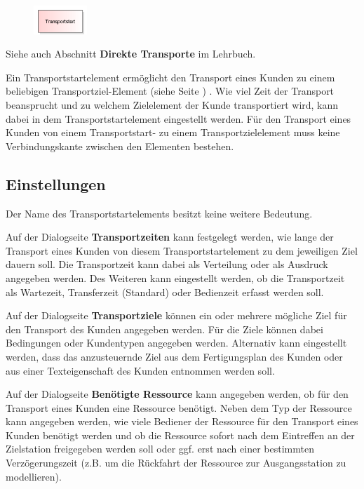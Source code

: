 \begin{figure}
\vspace{-22pt}
\includegraphics[width=2cm]{imageModelElementTransportSource.png}
\vspace{-22pt}
\end{figure}

Siehe auch Abschnitt \textbf{Direkte Transporte} im Lehrbuch.

Ein Transportstartelement ermöglicht den Transport eines Kunden zu einem beliebigen
Transportziel-Element (siehe Seite \pageref{ref:ModelElementTransportDestination}) . Wie viel
Zeit der Transport beansprucht und zu welchem Zielelement der Kunde transportiert
wird, kann dabei in dem Transportstartelement eingestellt werden.
Für den Transport eines Kunden von einem Transportstart- zu einem Transportzielelement
muss keine Verbindungskante zwischen den Elementen bestehen.

\subsection*{Einstellungen}

Der Name des Transportstartelements besitzt keine weitere Bedeutung.

Auf der Dialogseite \textbf{Transportzeiten} kann festgelegt werden, wie lange der Transport
eines Kunden von diesem Transportstartelement zu dem jeweiligen Ziel dauern soll. Die Transportzeit
kann dabei als Verteilung oder als Ausdruck angegeben werden. Des Weiteren kann eingestellt
werden, ob die Transportzeit als Wartezeit, Transferzeit (Standard) oder Bedienzeit
erfasst werden soll.

Auf der Dialogseite \textbf{Transportziele} können ein oder mehrere
mögliche Ziel für den Transport des Kunden angegeben werden. Für die Ziele können dabei
Bedingungen oder Kundentypen angegeben werden. Alternativ kann eingestellt werden, dass
das anzusteuernde Ziel aus dem Fertigungsplan des Kunden oder aus einer Texteigenschaft
des Kunden entnommen werden soll.

Auf der Dialogseite \textbf{Benötigte Ressource} kann angegeben werden, ob
für den Transport eines Kunden eine Ressource benötigt. Neben dem Typ der
Ressource kann angegeben werden, wie viele Bediener der Ressource für den
Transport eines Kunden benötigt werden und ob die Ressource sofort nach dem
Eintreffen an der Zielstation freigegeben werden soll oder ggf. erst nach
einer bestimmten Verzögerungszeit (z.B. um die Rückfahrt der Ressource
zur Ausgangsstation zu modellieren).


